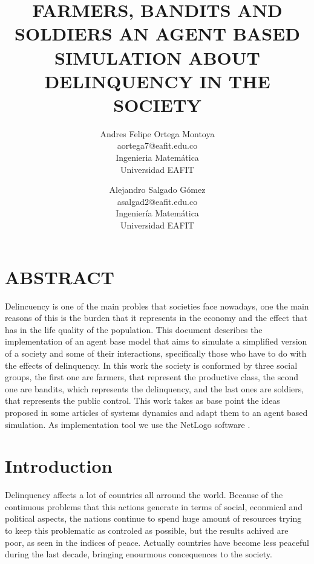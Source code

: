 \documentclass{wscpaperproc}
\begin{document}

\title{FARMERS, BANDITS AND SOLDIERS AN AGENT BASED SIMULATION ABOUT
       DELINQUENCY IN THE SOCIETY}

\author{Andres Felipe Ortega Montoya\\ [12pt]
aortega7@eafit.edu.co\\
Ingenieria Matemática\\
Universidad EAFIT\\
\and
Alejandro Salgado Gómez\\[12pt]
asalgad2@eafit.edu.co\\
Ingeniería Matemática\\
Universidad EAFIT\\
}

\maketitle

\section*{ABSTRACT}
Delincuency is one of the main probles that societies face nowadays,
one the main reasons of this is the burden that it represents in the
economy and the effect that has in the life quality of the population.
This document describes the implementation of an agent base model that aims to
simulate a simplified version of a society and some of their interactions,
specifically those who have to do with the effects of delinquency.
In this work the society is conformed by three social groups, the
first one are farmers, that represent the productive class, the scond
one are bandits, which represents the delinquency, and the last ones
are soldiers, that represents the public control. This work takes as base point
the ideas proposed in some articles of systems dynamics and adapt them to an
agent based simulation. As implementation tool we use the NetLogo software
\cite{netlogo}.

\section{Introduction}

Delinquency affects a lot of countries all arround the world. Because of the
continuous problems that this actions generate in terms of social, econmical and
political aspects, the nations continue to spend huge amount of resources
trying to keep this problematic as controled as possible, but the results achived
are poor, as seen in the indices of peace. Actually countries have become
less peaceful during the last decade, bringing enourmous concequences to the
society. \cite{peace} \cite{violence}
\end{document}
